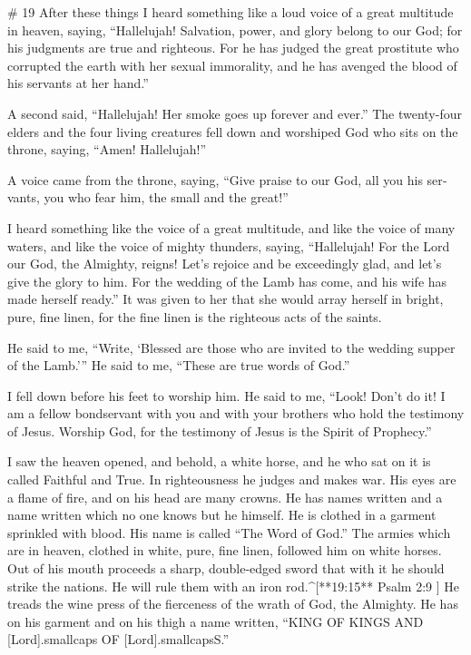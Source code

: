 \begin{paracols}{2}
\begin{english}
# 19
 After these things I heard something like a loud voice of a great multitude in heaven, saying, “Hallelujah! Salvation, power, and glory belong to our God;  for his judgments are true and righteous. For he has judged the great prostitute who corrupted the earth with her sexual immorality, and he has avenged the blood of his servants at her hand.” 

 A second said, “Hallelujah! Her smoke goes up forever and ever.”  The twenty-four elders and the four living creatures fell down and worshiped God who sits on the throne, saying, “Amen! Hallelujah!” 

 A voice came from the throne, saying, “Give praise to our God, all you his servants, you who fear him, the small and the great!” 

 I heard something like the voice of a great multitude, and like the voice of many waters, and like the voice of mighty thunders, saying, “Hallelujah! For the Lord our God, the Almighty, reigns!  Let’s rejoice and be exceedingly glad, and let’s give the glory to him. For the wedding of the Lamb has come, and his wife has made herself ready.”  It was given to her that she would array herself in bright, pure, fine linen, for the fine linen is the righteous acts of the saints. 

 He said to me, “Write, ‘Blessed are those who are invited to the wedding supper of the Lamb.’” He said to me, “These are true words of God.” 

 I fell down before his feet to worship him. He said to me, “Look! Don’t do it! I am a fellow bondservant with you and with your brothers who hold the testimony of Jesus. Worship God, for the testimony of Jesus is the Spirit of Prophecy.” 

 I saw the heaven opened, and behold, a white horse, and he who sat on it is called Faithful and True. In righteousness he judges and makes war.  His eyes are a flame of fire, and on his head are many crowns. He has names written and a name written which no one knows but he himself.  He is clothed in a garment sprinkled with blood. His name is called “The Word of God.”  The armies which are in heaven, clothed in white, pure, fine linen, followed him on white horses.  Out of his mouth proceeds a sharp, double-edged sword that with it he should strike the nations. He will rule them with an iron rod.^[**19:15** Psalm 2:9 ] He treads the wine press of the fierceness of the wrath of God, the Almighty.  He has on his garment and on his thigh a name written, “KING OF KINGS AND [Lord]{.smallcaps} OF [Lord]{.smallcaps}S.” 


\end{english}
\end{paracols}
